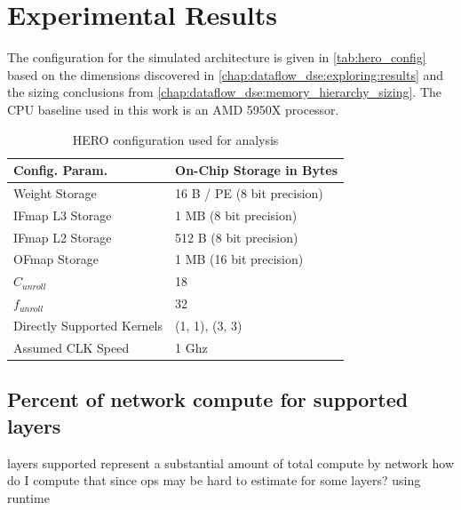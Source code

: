 \section{Experimental Results}
\label{chap:hero:results}

The configuration for the simulated architecture is given in
\autoref{tab:hero_config} based on the dimensions discovered in
\autoref{chap:dataflow_dse:exploring:results} and the sizing conclusions from
\autoref{chap:dataflow_dse:memory_hierarchy_sizing}. The CPU baseline used in
this work is an AMD 5950X processor. 

\begin{table}[]
    \center
    \begin{tabular}{|l|l|}
    \toprule
    Config. Param. & On-Chip Storage in Bytes    \\ 
    \midrule
    Weight Storage            & 16 B / PE (8 bit precision)  \\ \hline
    IFmap L3 Storage          & 1 MB (8 bit precision)   \\ \hline
    IFmap L2 Storage          & 512 B (8 bit precision)   \\ \hline
    OFmap Storage             & 1 MB (16 bit precision)   \\ \hline
    $C_{unroll}$              & 18   \\ \hline
    $f_{unroll}$              & 32   \\ \hline
    Directly Supported Kernels             & {(1, 1), (3, 3)}   \\ \hline
    Assumed CLK Speed             & 1 Ghz   \\ \hline
\end{tabular}
\caption{HERO configuration used for analysis}
\label{tab:hero_config}
\end{table}

\subsection{Percent of network compute for supported layers}
\label{chap:hero:sim_platform:cigar_side}

layers supported represent a substantial amount of total compute by network
how do I compute that since ops may be hard to estimate for some layers?
using runtime

